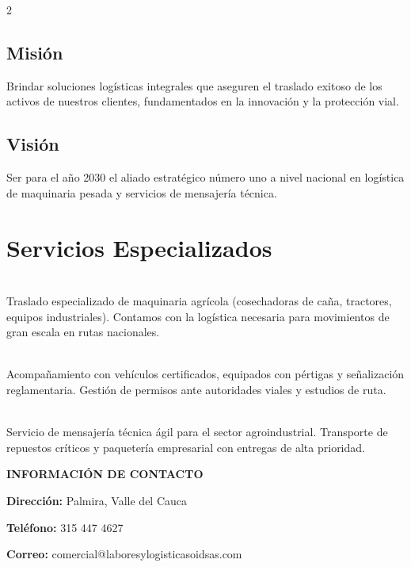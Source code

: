 \documentclass[11pt, a4paper]{article}
\begin{document}
\begin{multicols}{2}
    \subsection*{Misión}
    Brindar soluciones logísticas integrales que aseguren el traslado exitoso de los activos de nuestros clientes, fundamentados en la innovación y la protección vial.
    
    \columnbreak
    
    \subsection*{Visión}
    Ser para el año 2030 el aliado estratégico número uno a nivel nacional en logística de maquinaria pesada y servicios de mensajería técnica.
\end{multicols}

\vspace{0.8cm}

\section*{Servicios Especializados}

\begin{description}[style=unboxed,leftmargin=0cm]
    \item[\color{SoidGreen}\Large\textbf{01. CARGA EXTRADIMENSIONADA}] \hfill \\
    Traslado especializado de maquinaria agrícola (cosechadoras de caña, tractores, equipos industriales). Contamos con la logística necesaria para movimientos de gran escala en rutas nacionales.
    
    \item[\color{SoidOrange}\Large\textbf{02. ESCOLTA TÉCNICA VIAL}] \hfill \\
    Acompañamiento con vehículos certificados, equipados con pértigas y señalización reglamentaria. Gestión de permisos ante autoridades viales y estudios de ruta.
    
    \item[\color{SoidGreen}\Large\textbf{03. MENSAJERÍA Y ENCOMIENDAS}] \hfill \\
    Servicio de mensajería técnica ágil para el sector agroindustrial. Transporte de repuestos críticos y paquetería empresarial con entregas de alta prioridad.
\end{description}

\vspace{2cm}

\begin{center}
    \begin{tcolorbox}[colback=SoidDark, colframe=SoidDark, arc=15pt, width=12cm]
        \color{white}
        \centerline{\large \textbf{INFORMACIÓN DE CONTACTO}}
        \vspace{0.3cm}
        \centerline{\small \textbf{Dirección:} Palmira, Valle del Cauca}
        \centerline{\small \textbf{Teléfono:} 315 447 4627}
        \centerline{\small \textbf{Correo:} comercial@laboresylogisticasoidsas.com}
    \end{tcolorbox}
\end{center}
\end{document}
